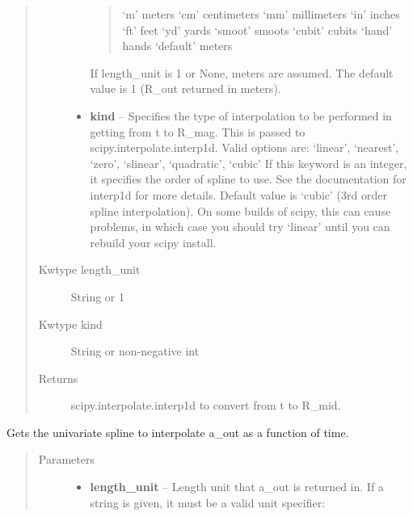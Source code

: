 \documentclass[letterpaper,10pt,english]{sphinxmanual}
\begin{document}
\begin{fulllineitems}
\begin{fulllineitems}
\begin{quote}
\begin{description}
\begin{itemize}
\begin{quote}
`m'         meters
`cm'        centimeters
`mm'        millimeters
`in'        inches
`ft'        feet
`yd'        yards
`smoot'     smoots
`cubit'     cubits
`hand'      hands
`default'   meters
\end{quote}

If length\_unit is 1 or None, meters are assumed. The default
value is 1 (R\_out returned in meters).


\item {} 
\textbf{kind} -- Specifies the type of interpolation
to be performed in getting from t to R\_mag. This is
passed to scipy.interpolate.interp1d. Valid options are:
`linear', `nearest', `zero', `slinear', `quadratic', `cubic'
If this keyword is an integer, it specifies the order of spline
to use. See the documentation for interp1d for more details.
Default value is `cubic' (3rd order spline interpolation). On
some builds of scipy, this can cause problems, in which case
you should try `linear' until you can rebuild your scipy install.

\end{itemize}

\item[{Kwtype length\_unit}] \leavevmode
String or 1

\item[{Kwtype kind}] \leavevmode
String or non-negative int

\item[{Returns}] \leavevmode
scipy.interpolate.interp1d to convert from t to R\_mid.

\end{description}\end{quote}

\end{fulllineitems}


\begin{fulllineitems}
\label{eqtools:eqtools.core.Equilibrium.getAOutSpline}
Gets the univariate spline to interpolate a\_out as a function of time.
\begin{quote}\begin{description}
\item[{Parameters}] \leavevmode\begin{itemize}
\item {} 
\textbf{length\_unit} -- 
Length unit that a\_out is returned in. If
a string is given, it must be a valid unit specifier:
\begin{quote}


\end{quote}
\end{itemize}
\end{description}
\end{quote}
\end{fulllineitems}
\end{fulllineitems}
\end{document}
